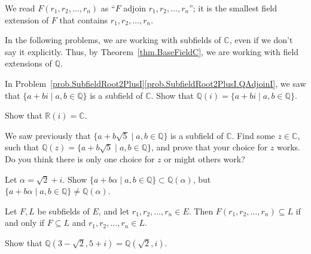 We read $F(r_1,r_2,\ldots,r_n)$  as ``$F$ adjoin $r_1,r_2,\ldots,r_n$''; it is the smallest field extension of $F$ that contains $r_1,r_2,\ldots,r_n$.

In the following problems, we are working with subfields of $\mathbb{C}$, even if we don't say it explicitly. Thus, by Theorem~\ref{thm.BaseFieldC}, we are working with field extensions of $\mathbb{Q}.$

\begin{problem}\label{prob.QAdjoinI}
In Problem~\ref{prob.SubfieldRoot2PlusI}\ref{prob.SubfieldRoot2PlusI.QAdjoinI}, we saw that $\{a+bi\mid a,b\in \mathbb{Q}\}$ is a subfield of $\mathbb{C}$. 
Show that $\mathbb{Q}(i) = \{a+bi\mid a,b\in \mathbb{Q}\}$. 
\end{problem}

\begin{problem}
Show that $\mathbb{R}(i) =\mathbb{C}$. 
\end{problem}

\begin{problem}
We saw previously that $\{a+b\sqrt{5}\mid a,b\in \mathbb{Q}\}$ is a subfield of $\mathbb{C}$. Find some $z\in \mathbb{C}$, such that $\mathbb{Q}(z) = \{a+b\sqrt{5}\mid a,b\in \mathbb{Q}\}$, and prove that your choice for $z$ works. Do you think there is only one choice for $z$ or might others work?
\end{problem}

\begin{problem}\label{prob.QAdjoinRoot2PlusI}
Let $\alpha = \sqrt{2} + i$. Show  $\{a+b\alpha\mid a,b\in \mathbb{Q}\} \subset \mathbb{Q}(\alpha)$, but $\{a+b\alpha\mid a,b\in \mathbb{Q}\} \neq \mathbb{Q}(\alpha)$. 
\end{problem}


\begin{theorem}
Let $F,L$ be subfields of $E$, and let $r_1,r_2,\ldots,r_n \in E$. Then $F(r_1,r_2,\ldots,r_n) \subseteq L$ if and only if $F\subseteq L$ and $r_1,r_2,\ldots,r_n\in L$.
\end{theorem}

\begin{problem}\label{prob.QAdjoinRoot27Root7}
Show that $\mathbb{Q}\left(3-\sqrt{2},5+i\right) = \mathbb{Q}\left(\sqrt{2},i\right)$.
\end{problem}

